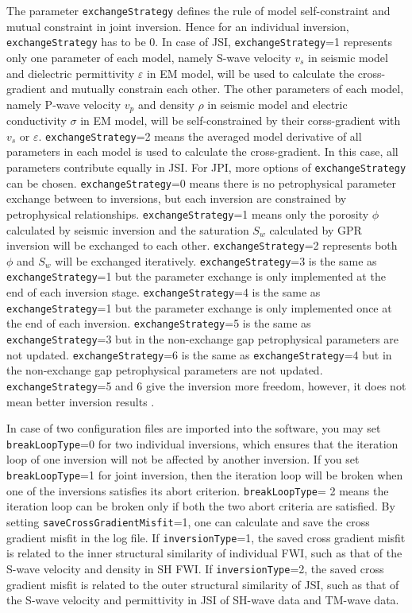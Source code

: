 \documentclass[pdftex,a4paper,parskip,listof=totoc,bibliography=totoc,onehalfspacing,12pt]{scrreprt}
\begin{document}
The parameter \verb+exchangeStrategy+ defines the rule of model self-constraint and mutual constraint in joint inversion. Hence for an individual inversion, \verb+exchangeStrategy+ has to be 0. In case of JSI, \verb+exchangeStrategy+=1 represents only one parameter of each model, namely S-wave velocity $v_s$ in seismic model and dielectric permittivity $\varepsilon$ in EM model, will be used to calculate the cross-gradient and mutually constrain each other. The other parameters of each model, namely P-wave velocity $v_p$ and density $\rho$ in seismic model and electric conductivity $\sigma$ in EM model, will be self-constrained by their corss-gradient with $v_s$ or $\varepsilon$. \verb+exchangeStrategy+=2 means the averaged model derivative of all parameters in each model is used to calculate the cross-gradient. In this case, all parameters contribute equally in JSI. For JPI, more options of \verb+exchangeStrategy+ can be chosen. \verb+exchangeStrategy+=0 means there is no petrophysical parameter exchange between to inversions, but each inversion are constrained by petrophysical relationships. \verb+exchangeStrategy+=1 means only the porosity $\phi$ calculated by seismic inversion and the saturation $S_w$ calculated by GPR inversion will be exchanged to each other. \verb+exchangeStrategy+=2 represents both $\phi$ and $S_w$ will be exchanged iteratively. \verb+exchangeStrategy+=3 is the same as \verb+exchangeStrategy+=1 but the parameter exchange is only implemented at the end of each inversion stage. \verb+exchangeStrategy+=4 is the same as \verb+exchangeStrategy+=1 but the parameter exchange is only implemented once at the end of each inversion. \verb+exchangeStrategy+=5 is the same as \verb+exchangeStrategy+=3 but in the non-exchange gap petrophysical parameters are not updated. \verb+exchangeStrategy+=6 is the same as \verb+exchangeStrategy+=4 but in the non-exchange gap petrophysical parameters are not updated. \verb+exchangeStrategy+=5 and 6 give the inversion more freedom, however, it does not mean better inversion results \cite{qin2021joint}.

In case of two configuration files are imported into the software, you may set \verb+breakLoopType+=0 for two individual inversions, which ensures that the iteration loop of one inversion will not be affected by another inversion. If you set \verb+breakLoopType+=1 for joint inversion, then the iteration loop will be broken when one of the inversions satisfies its abort criterion. \verb+breakLoopType+= 2 means the iteration loop can be broken only if both the two abort criteria are satisfied. By setting \verb+saveCrossGradientMisfit+=1, one can calculate and save the cross gradient misfit in the log file. If \verb+inversionType+=1, the saved cross gradient misfit is related to the inner structural similarity of individual FWI, such as that of the S-wave velocity and density in SH FWI. If \verb+inversionType+=2, the saved cross gradient misfit is related to the outer structural similarity of JSI, such as that of the S-wave velocity and permittivity in JSI of SH-wave data and TM-wave data.
\end{document}

